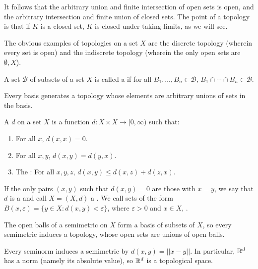 \begin{subsec}
It follows that the arbitrary union and finite intersection of open sets is open, and the arbitrary intersection and finite union of closed sets.
The point of a topology is that if $K$ is a closed set, $K$ is closed under taking limits, as we will see.
\end{subsec}

\begin{subsec}
The obvious examples of topologies on a set $X$ are the discrete topology (wherein every set is open) and the indiscrete topology (wherein the only open sets are $\emptyset, X$).
\end{subsec}

\begin{definition}
A set $\mathcal B$ of subsets of a set $X$ is called a  if for all $B_1, \dots, B_{n} \in \mathcal B$, $B_1 \cap \cdots \cap B_{n} \in \mathcal B$.
\end{definition}

\begin{subsec}
Every basis generates a topology whose elements are arbitrary unions of sets in the basis.
\end{subsec}

\begin{definition}
A  $d$ on a set $X$ is a function $d: X \times X \to [0, \infty)$ such that:
\begin{enumerate}
\item For all $x$, $d(x, x) = 0$.
\item For all $x,y$, $d(x, y) = d(y, x)$.
\item The : For all $x,y,z$, $d(x, y) \leq d(x, z) + d(z, x)$.
\end{enumerate}
If the only pairs $(x, y)$ such that $d(x, y) = 0$ are those with $x=y$, we say that $d$ is a  and call $X = (X,d)$ a .
We call sets of the form $B(x, \varepsilon) = \{y \in X: d(x, y) < \varepsilon\}$, where $\varepsilon > 0$ and $x \in X$, .
\end{definition}

\begin{subsec}
The open balls of a semimetric on $X$ form a basis of subsets of $X$, so every semimetric induces a topology, whose open sets are unions of open balls.
\end{subsec}

\begin{example}
Every seminorm induces a semimetric by $d(x, y) = ||x - y||$.
In particular, $\mathbb{R}^d$ has a norm (namely its absolute value), so $\mathbb{R}^d$ is a topological space.
\end{example}

